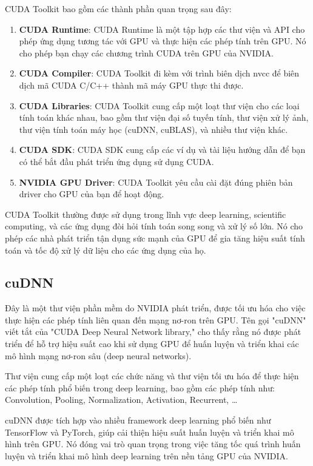 CUDA Toolkit bao gồm các thành phần quan trọng sau đây:
\begin{enumerate}
    \item \textbf{CUDA Runtime}: CUDA Runtime là một tập hợp các thư viện và API cho phép ứng dụng tương tác với GPU và thực hiện các phép tính trên GPU. Nó cho phép bạn chạy các chương trình CUDA trên GPU của NVIDIA.
    \item \textbf{CUDA Compiler}: CUDA Toolkit đi kèm với trình biên dịch nvcc để biên dịch mã CUDA C/C++ thành mã máy GPU thực thi được.
    \item \textbf{CUDA Libraries}: CUDA Toolkit cung cấp một loạt thư viện cho các loại tính toán khác nhau, bao gồm thư viện đại số tuyến tính, thư viện xử lý ảnh, thư viện tính toán máy học (cuDNN, cuBLAS), và nhiều thư viện khác.
    \item \textbf{CUDA SDK}: CUDA SDK cung cấp các ví dụ và tài liệu hướng dẫn để bạn có thể bắt đầu phát triển ứng dụng sử dụng CUDA.
    \item \textbf{NVIDIA GPU Driver}: CUDA Toolkit yêu cầu cài đặt đúng phiên bản driver cho GPU của bạn để hoạt động.
\end{enumerate}

CUDA Toolkit thường được sử dụng trong lĩnh vực deep learning, scientific computing, và các ứng dụng đòi hỏi tính toán song song và xử lý số lớn. Nó cho phép các nhà phát triển tận dụng sức mạnh của GPU để gia tăng hiệu suất tính toán và tốc độ xử lý dữ liệu cho các ứng dụng của họ.

\subsection{cuDNN}
Đây là một thư viện phần mềm do NVIDIA phát triển, được tối ưu hóa cho việc thực hiện các phép tính liên quan đến mạng nơ-ron trên GPU. Tên gọi "cuDNN" viết tắt của "CUDA Deep Neural Network library," cho thấy rằng nó được phát triển để hỗ trợ hiệu suất cao khi sử dụng GPU để huấn luyện và triển khai các mô hình mạng nơ-ron sâu (deep neural networks).

Thư viện cung cấp một loạt các chức năng và thư viện tối ưu hóa để thực hiện các phép tính phổ biến trong deep learning, bao gồm các phép tính như: Convolution, Pooling, Normalization, Activation, Recurrent, \ldots

cuDNN được tích hợp vào nhiều framework deep learning phổ biến như TensorFlow và PyTorch, giúp cải thiện hiệu suất huấn luyện và triển khai mô hình trên GPU. Nó đóng vai trò quan trọng trong việc tăng tốc quá trình huấn luyện và triển khai mô hình deep learning trên nền tảng GPU của NVIDIA.
